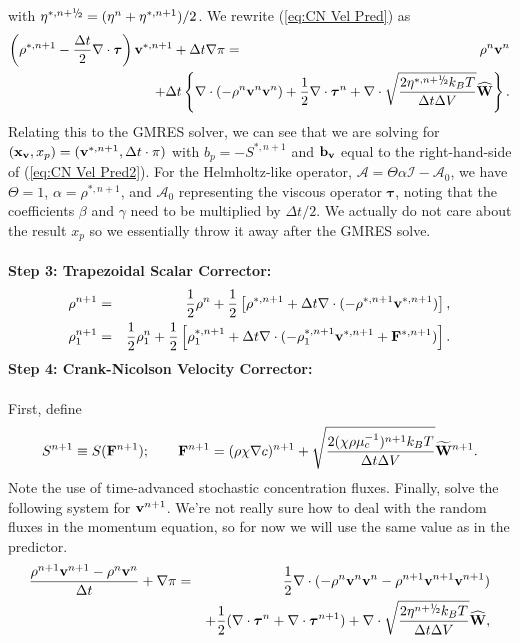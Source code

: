 \documentclass[final]{siamltex}
\newcommand{\sfrac}[2]{\mathchoice
  {\kern0em\raise.5ex\hbox{\the\scriptfont0 #1}\kern-.15em/
   \kern-.15em\lower.25ex\hbox{\the\scriptfont0 #2}}
  {\kern0em\raise.5ex\hbox{\the\scriptfont0 #1}\kern-.15em/
   \kern-.15em\lower.25ex\hbox{\the\scriptfont0 #2}}
  {\kern0em\raise.5ex\hbox{\the\scriptscriptfont0 #1}\kern-.2em/
   \kern-.15em\lower.25ex\hbox{\the\scriptscriptfont0 #2}}
  {#1\!/#2}}
\def\bb {{\bf b}}
\def\Fb {{\bf F}}
\def\vb {{\bf v}}
\def\Wb {{\bf W}}
\def\xb {{\bf x}}
\def\taub {\boldsymbol{\tau}}
\def\half   {\frac{1}{2}}
\def\myhalf {\sfrac{1}{2}}
\begin{document}
with $\eta^{*,n+\myhalf} = (\eta^n + \eta^{*,n+1})/2$.
We rewrite (\ref{eq:CN Vel Pred}) as
\begin{eqnarray}
\left(\rho^{*,n+1} - \frac{\Delta t}{2}\nabla\cdot\taub\right)\vb^{*,n+1} + \Delta t\nabla\pi &=& \rho^n\vb^n\nonumber\\
&&\hspace{-1.0in}+ \Delta t\left\{\nabla\cdot(-\rho^n\vb^n\vb^n) + \half\nabla\cdot\taub^n + \nabla\cdot\sqrt{\frac{2\eta^{*,n+\myhalf} k_B T}{\Delta t\Delta V}}\widehat\Wb\right\}.\label{eq:CN Vel Pred2}
\end{eqnarray}
Relating this to the GMRES solver, we can see that we are solving for 
$(\xb_\vb,x_p) = (\vb^{*,n+1},\Delta t\cdot\pi)$ with $b_p = -S^{*,n+1}$ and $\bb_\vb$ equal to the 
right-hand-side of (\ref{eq:CN Vel Pred2}).  For the Helmholtz-like operator, 
$\mathcal{A}=\Theta\alpha\mathcal{I} - \mathcal{A}_0$, we have $\Theta=1$, $\alpha=\rho^{*,n+1}$,
and $\mathcal{A}_0$ representing the viscous operator $\taub$, noting that the coefficients
$\beta$ and $\gamma$ need to be multiplied by $\Delta t/2$.  We actually do not care about
the result $x_p$ so we essentially throw it away after the GMRES solve.\\ \\
{\bf Step 3: Trapezoidal Scalar Corrector:}
\begin{eqnarray}
\rho^{n+1} &=& \half\rho^n + \half\left[\rho^{*,n+1} + \Delta t\nabla\cdot(-\rho^{*,n+1}\vb^{*,n+1})\right],\\
\rho_1^{n+1} &=& \half\rho_1^n + \half\left[\rho_1^{*,n+1} + \Delta t\nabla\cdot(-\rho_1^{*,n+1}\vb^{*,n+1} + \Fb^{*,n+1})\right].
\end{eqnarray}
{\bf Step 4: Crank-Nicolson Velocity Corrector:}\\ \\
First, define
\begin{equation}
S^{n+1} \equiv S(\Fb^{n+1});
\qquad
\Fb^{n+1} = (\rho\chi\nabla c)^{n+1} + \sqrt{\frac{2(\chi\rho\mu_c^{-1})^{n+1}k_BT}{\Delta t\Delta V}}\widetilde\Wb^{n+1}.
\end{equation}
Note the use of time-advanced stochastic concentration fluxes.  Finally, solve 
the following system for $\vb^{n+1}$.  We're not really sure how to deal with the
random fluxes in the momentum equation, so for now we will use the same value as 
in the predictor.
\begin{eqnarray}
\frac{\rho^{n+1}\vb^{n+1} - \rho^n\vb^n}{\Delta t} + \nabla\pi &=& \half\nabla\cdot(-\rho^n\vb^n\vb^n - \rho^{n+1}\vb^{n+1}\vb^{n+1})\nonumber\\
&&+ \half(\nabla\cdot\taub^n + \nabla\cdot\taub^{n+1}) + \nabla\cdot\sqrt{\frac{2\eta^{n+\myhalf} k_B T}{\Delta t\Delta V}}\widehat\Wb,\label{eq:CN Vel Corr}
\end{eqnarray}
\end{document}
